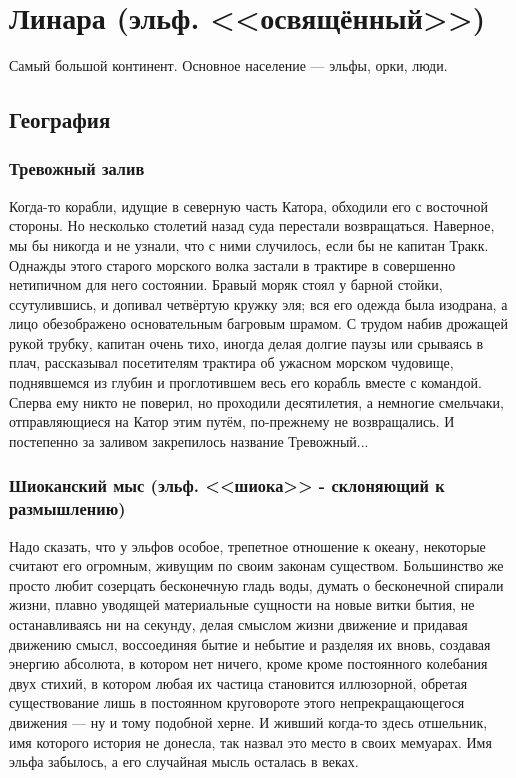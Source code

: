 \documentclass[12pt,a4paper]{book}
\begin{document}
\chapter{Линара (эльф. <<освящённый>>)}

Самый большой континент. Основное население --- эльфы, орки, люди.

\section{География}

\subsection{Тревожный залив}

Когда-то корабли, идущие в северную часть Катора, обходили его с восточной стороны. Но несколько столетий назад суда перестали возвращаться. Наверное, мы бы никогда и не узнали, что с ними случилось, если бы не капитан Тракк. Однажды этого старого морского волка застали в трактире в совершенно нетипичном для него состоянии. Бравый моряк стоял у барной стойки, ссутулившись, и допивал четвёртую кружку эля; вся его одежда была изодрана, а лицо обезображено основательным багровым шрамом. С трудом набив дрожащей рукой трубку, капитан очень тихо, иногда делая долгие паузы или срываясь в плач, рассказывал посетителям трактира об ужасном морском чудовище, поднявшемся из глубин и проглотившем весь его корабль вместе с командой. Сперва ему никто не поверил, но проходили десятилетия, а немногие смельчаки, отправляющиеся на Катор этим путём, по-прежнему не возвращались. И постепенно за заливом закрепилось название Тревожный...

\subsection{Шиоканский мыс (эльф. <<шиока>> - склоняющий к размышлению)}

Надо сказать, что у эльфов особое, трепетное отношение к океану, некоторые считают его огромным, живущим по своим законам существом. Большинство же просто любит созерцать бесконечную гладь воды, \mbox{думать} о бесконечной спирали жизни, плавно уводящей материальные сущности на новые витки бытия, не останавливаясь ни на секунду, делая смыслом жизни движение и придавая движению смысл, воссоединяя бытие и небытие и разделяя их вновь, создавая энергию абсолюта, в котором нет ничего, кроме кроме постоянного колебания двух стихий, в котором любая их частица становится иллюзорной, обретая существование лишь в постоянном круговороте этого непрекращающегося движения — ну и тому подобной херне. И живший когда-то здесь отшельник, имя которого история не донесла, так назвал это место в своих мемуарах. Имя эльфа забылось, а его случайная мысль осталась в веках.
\end{document}
